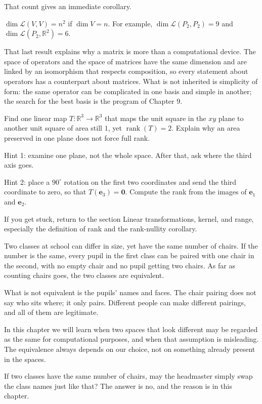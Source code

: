 That count gives an immediate corollary.

\begin{akibat}
$\dim\mathcal{L}(V,V)=n^{2}$ if $\dim V=n$. For example,
$\dim\mathcal{L}(P_{2},P_{2})=9$ and $\dim\mathcal{L}(P_{2},\mathbb{R}^{2})=6$.
\end{akibat}

That last result explains why a matrix is more than a computational device. The space of operators
and the space of matrices have the same dimension and are linked by an isomorphism that respects composition,
so every statement about operators has a counterpart about matrices. What is not
inherited
is simplicity of form: the same operator can be complicated in one basis and simple
in
another; the search for the best basis is the program of Chapter 9.

\begin{tantangan}
Find one linear map $T\colon\mathbb{R}^{3}\to\mathbb{R}^{3}$ that maps the unit square
in the $xy$ plane to another unit square of area still $1$, yet
$\operatorname{rank}(T)=2$. Explain why an area preserved in one plane does not
force
full rank.

Hint 1: examine one plane, not the whole space. After that, ask where the third axis
goes.

Hint 2: place a $90^{\circ}$ rotation on the first two coordinates and send the third coordinate to zero,
so that $T(\mathbf{e}_{3})=\mathbf{0}$. Compute the rank from the images of $\mathbf{e}_{1}$ and
$\mathbf{e}_{2}$.

If you get stuck, return to the section Linear transformations, kernel, and range, especially the definition of
rank and the rank-nullity corollary.
\end{tantangan}

\begin{untukanak}
Two classes at school can differ in size, yet have the same number of chairs. If the
number is
the same, every pupil in the first class can be paired with one chair in the second, with no
empty
chair and no pupil getting two chairs. As far as counting chairs goes, the two classes are
equivalent.

What is not equivalent is the pupils' names and faces. The chair pairing does not say
who sits where; it only pairs. Different people can make different pairings,
and all of them are legitimate.

In this chapter we will learn when two spaces that look different may be regarded as the same for
computational purposes, and when that assumption is misleading. The equivalence always depends
on
our choice, not on something already present in the spaces.

If two classes have the same number of chairs, may the headmaster simply swap the class names
just
like that? The answer is no, and the reason is in this chapter.
\end{untukanak}


